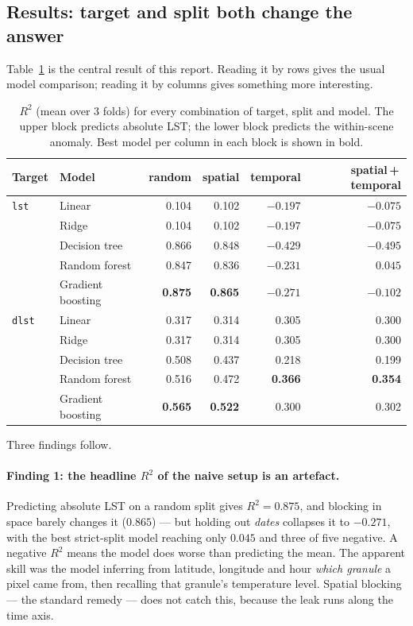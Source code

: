 \documentclass[10pt]{article}   %
\begin{document}
\subsection{Results: target and split both change the answer}
\label{sec:results}

Table~\ref{tab:models} is the central result of this report. Reading it by rows gives the
usual model comparison; reading it by columns gives something more interesting.

\begin{table}[H]
\centering
\caption{$R^2$ (mean over 3 folds) for every combination of target, split and model. The
upper block predicts absolute LST; the lower block predicts the within-scene anomaly. Best
model per column in each block is shown in bold.}
\label{tab:models}
\small
\begin{tabular}{llrrrr}
\toprule
Target & Model & random & spatial & temporal & spatial\,+\,temporal \\
\midrule
\texttt{lst} & Linear               & 0.104 & 0.102 & $-0.197$ & $-0.075$ \\
             & Ridge                & 0.104 & 0.102 & $-0.197$ & $-0.075$ \\
             & Decision tree        & 0.866 & 0.848 & $-0.429$ & $-0.495$ \\
             & Random forest        & 0.847 & 0.836 & $-0.231$ & $\mathbf{0.045}$ \\
             & Gradient boosting    & \textbf{0.875} & \textbf{0.865} & $-0.271$ & $-0.102$ \\
\midrule
\texttt{dlst} & Linear              & 0.317 & 0.314 & 0.305 & 0.300 \\
              & Ridge               & 0.317 & 0.314 & 0.305 & 0.300 \\
              & Decision tree       & 0.508 & 0.437 & 0.218 & 0.199 \\
              & Random forest       & 0.516 & 0.472 & \textbf{0.366} & \textbf{0.354} \\
              & Gradient boosting   & \textbf{0.565} & \textbf{0.522} & 0.300 & 0.302 \\
\bottomrule
\end{tabular}
\end{table}

Three findings follow.

\paragraph{Finding 1: the headline $R^2$ of the naive setup is an artefact.}
Predicting absolute LST on a random split gives $R^2 = 0.875$, and blocking in space barely
changes it ($0.865$) --- but holding out \emph{dates} collapses it to $-0.271$, with the best
strict-split model reaching only $0.045$ and three of five negative. A negative $R^2$ means
the model does worse than predicting the mean. The apparent skill was the model inferring
from latitude, longitude and hour \emph{which granule} a pixel came from, then recalling that
granule's temperature level. Spatial blocking --- the standard remedy --- does not catch
this, because the leak runs along the time axis.
\end{document}
